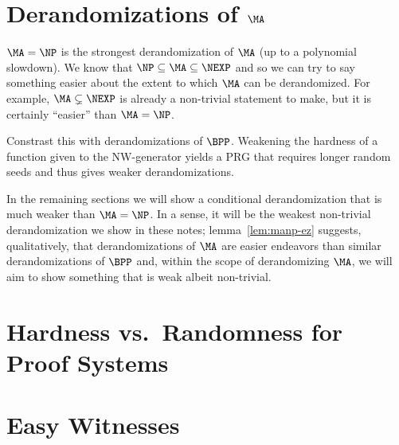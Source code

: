 \section[\texorpdfstring{Derandomizations of $\MA$}{Derandomizations of MA}]{Derandomizations of $\MA$}

$\MA = \NP$ is the strongest derandomization of $\MA$ (up to a polynomial slowdown).
We know that $\NP \subseteq \MA \subseteq \NEXP$ and so we can try to say something easier
about the extent to which $\MA$ can be derandomized.
For example, $\MA \subsetneq \NEXP$ is already a non-trivial statement to make, but
it is certainly ``easier'' than $\MA = \NP$.

Constrast this with derandomizations of $\BPP$.
Weakening the hardness of a function given to the NW-generator yields a PRG that requires 
longer random seeds and thus gives weaker derandomizations.

In the remaining sections we will show a conditional derandomization that is much weaker 
than $\MA = \NP$.
In a sense, it will be the weakest non-trivial derandomization we show in these notes;
lemma~\ref{lem:manp-ez} suggests, qualitatively, that derandomizations of $\MA$ are 
easier endeavors than similar derandomizations of $\BPP$ and, within the scope of 
derandomizing $\MA$, we will aim to show something that is weak albeit non-trivial.

\section{Hardness vs.\ Randomness for Proof Systems}

\section{Easy Witnesses}
